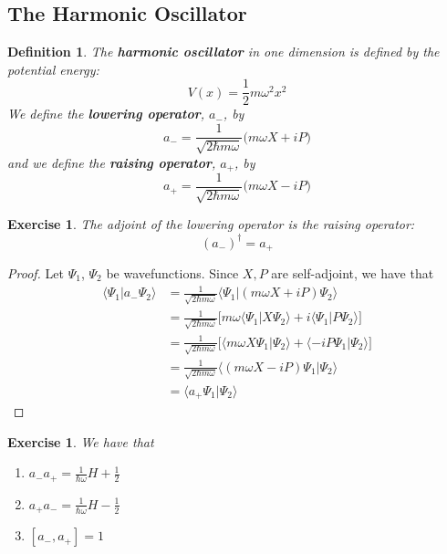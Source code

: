\documentclass[12pt]{amsart}
\newtheorem{defn}[thm]{Definition}
\newtheorem{ex}[thm]{Exercise}
\renewcommand{\r}{\rangle}
\renewcommand{\l}{\langle}
\newcommand{\om}{\omega}
\begin{document}
\subsection{The Harmonic Oscillator}

\begin{defn}
The \textbf{harmonic oscillator} in one dimension is defined by the potential energy: $$V(x) = \frac{1}{2}m \om^2 x^2$$ We define the \textbf{lowering operator}, $a_-$, by $$a_- = \frac{1}{\sqrt{2 \hbar m \om }}\bigg(m\om X +iP\bigg)$$  and we define the \textbf{raising operator}, $a_+$, by $$a_+ = \frac{1}{\sqrt{2 \hbar m \om }}\bigg(m\om X -iP\bigg)$$
\end{defn}

\begin{ex}
The adjoint of the lowering operator is the raising operator: $$(a_-)^{\dagger} = a_+$$
\end{ex}

\begin{proof}
Let $\Psi_1$, $\Psi_2$ be wavefunctions. Since $X,P$ are self-adjoint, we have that
\begin{align*}
\l \Psi_1 \vert a_- \Psi_2\r
&= \frac{1}{\sqrt{2 \hbar m \om}} \l\Psi_1 \vert (m\om X +iP) \Psi_2 \r \\
&= \frac{1}{\sqrt{2 \hbar m \om}}\bigg[ m \om \l\Psi_1 \vert X \Psi_2 \r +i \l \Psi_1 \vert  P \Psi_2 \r \bigg] \\
&= \frac{1}{\sqrt{2 \hbar m \om}}\bigg[  \l m \om X \Psi_1 \vert \Psi_2 \r + \l -i P \Psi_1 \vert \Psi_2 \r \bigg] \\
&= \frac{1}{\sqrt{2 \hbar m \om}}  \l (m \om X -iP)\Psi_1 \vert \Psi_2 \r  \\
&= \l a_+ \Psi_1 \vert \Psi_2\r 
\end{align*}
\end{proof}

\begin{ex}
We have that 
\begin{enumerate}
\item $a_-a_+ = \frac{1}{\hbar \om}H + \frac{1}{2}$
\item $a_+a_- = \frac{1}{\hbar \om}H - \frac{1}{2}$
\item $[a_-,a_+] = 1$
\end{enumerate}
\end{ex}
\end{document}
